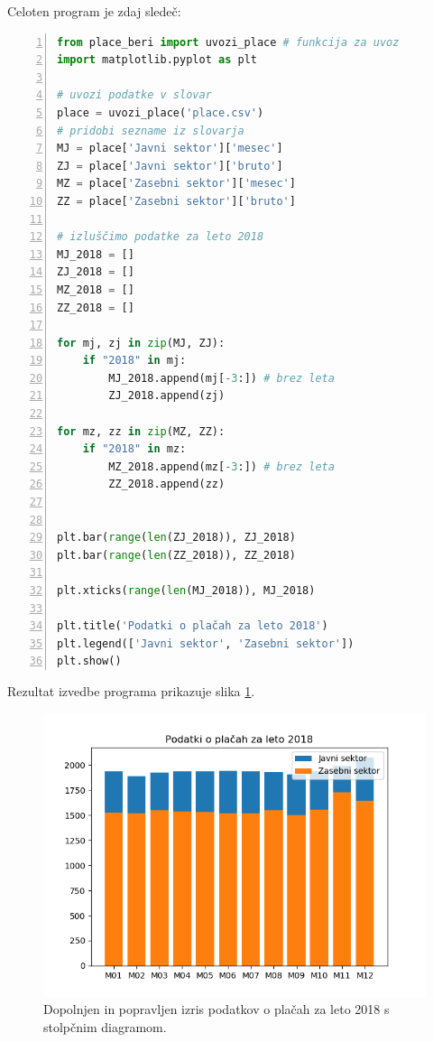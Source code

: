 Celoten program je zdaj sledeč:
\begin{lstlisting}[language=Python,numbers=left]
from place_beri import uvozi_place # funkcija za uvoz
import matplotlib.pyplot as plt

# uvozi podatke v slovar
place = uvozi_place('place.csv')
# pridobi sezname iz slovarja
MJ = place['Javni sektor']['mesec']
ZJ = place['Javni sektor']['bruto']
MZ = place['Zasebni sektor']['mesec']
ZZ = place['Zasebni sektor']['bruto']

# izluščimo podatke za leto 2018
MJ_2018 = []
ZJ_2018 = []
MZ_2018 = []
ZZ_2018 = []

for mj, zj in zip(MJ, ZJ):
    if "2018" in mj:
        MJ_2018.append(mj[-3:]) # brez leta
        ZJ_2018.append(zj)

for mz, zz in zip(MZ, ZZ):
    if "2018" in mz:
        MZ_2018.append(mz[-3:]) # brez leta
        ZZ_2018.append(zz)


plt.bar(range(len(ZJ_2018)), ZJ_2018)
plt.bar(range(len(ZZ_2018)), ZZ_2018)

plt.xticks(range(len(MJ_2018)), MJ_2018)

plt.title('Podatki o plačah za leto 2018')
plt.legend(['Javni sektor', 'Zasebni sektor'])
plt.show()
\end{lstlisting}
Rezultat izvedbe programa prikazuje slika \ref{img:plt7}.
\begin{figure}
    \includegraphics[width=\linewidth]{img/plt7.png}
    \caption{Dopolnjen in popravljen izris podatkov o plačah za leto 2018 s stolpčnim diagramom.}
    \label{img:plt7}
\end{figure}

